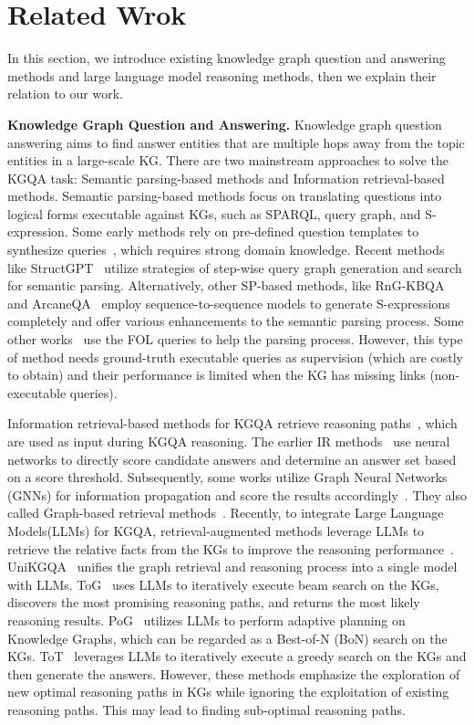 \documentclass[lettersize,journal]{IEEEtran}
\begin{document}
\section{Related Wrok}
In this section, we introduce existing knowledge graph question and answering methods and large language model reasoning methods, then we explain their relation to our work.

\textbf{Knowledge Graph Question and Answering.} Knowledge graph question answering aims to find answer entities that are multiple hops away from the topic entities in a large-scale KG. There are two mainstream approaches to solve the KGQA task: Semantic parsing-based methods and Information retrieval-based methods.
Semantic parsing-based methods focus on translating questions into logical forms executable against KGs, such as SPARQL, query graph, and S-expression. Some early methods rely on pre-defined question templates to synthesize queries~\cite{reddy2014large}, which requires strong domain knowledge. Recent methods like StructGPT~\cite{jiang2023structgpt} utilize strategies of step-wise query graph generation and search for semantic parsing.
Alternatively, other SP-based methods, like RnG-KBQA~\cite{ye2021rng} and ArcaneQA~\cite{gu2022arcaneqa} employ sequence-to-sequence models to generate S-expressions completely and offer various enhancements to the semantic parsing process. Some other works~\cite{ren2020query2box, long2022neural} use the FOL queries to help the parsing process. However, this type of method needs ground-truth executable queries as supervision (which are costly to obtain) and their performance is limited when the KG has missing links (non-executable queries).

Information retrieval-based methods for KGQA retrieve reasoning paths~\cite{zhang2022subgraph}, which are used as input during KGQA reasoning. The earlier IR methods~\cite{he2021improving} use neural networks to directly score candidate answers and determine an answer set based on a score threshold. Subsequently, some works utilize Graph Neural Networks (GNNs) for information propagation and score the results accordingly~\cite{sun2019pullnet}. They also called Graph-based retrieval methods~\cite{mavromatis2024gnn}. Recently, to integrate Large Language Models(LLMs) for KGQA, retrieval-augmented methods leverage LLMs to retrieve the relative facts from the KGs to improve the reasoning performance~\cite{chen2024plan, sun2023think, luo2023reasoning, long2025eperm}. UniKGQA~\cite{jiang2022unikgqa} unifies the graph retrieval and reasoning process into a single model with LLMs. ToG~\cite{sun2023think} uses LLMs to iteratively execute beam search on the KGs, discovers the most promising reasoning paths, and returns the most likely reasoning results. PoG~\cite{chen2024plan} utilizes LLMs to perform adaptive planning on Knowledge Graphs, which can be regarded as a Best-of-N (BoN) search on the KGs. ToT~\cite{markowitz2024tree} leverages LLMs to iteratively execute a greedy search on the KGs and then generate the answers. However, these methods emphasize the exploration of new optimal reasoning paths in KGs while ignoring the exploitation of existing reasoning paths. This may lead to finding sub-optimal reasoning paths.
\end{document}
